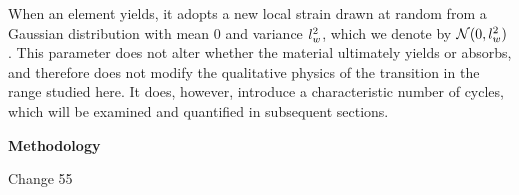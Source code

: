 \documentclass[asymmetricmargins]{library/duthesis}%
\newcommand{\DiffReportBodyFont}{\small}
\newcommand{\DiffReportLocationFont}{\large\bfseries}
\newcommand{\DiffReportMetaFont}{\small\ttfamily}
\newcommand{\DiffReportLocation}[1]{%
  \Needspace{4\baselineskip}%
  \par\medskip
  {\DiffReportLocationFont #1\par}
}
\newcommand{\DiffReportChange}[1]{%
  \Needspace{4\baselineskip}%
  \par\smallskip
  {\DiffReportMetaFont Change #1\par}
  \smallskip
}
\newenvironment{DiffReportContent}
  {\begingroup\DiffReportBodyFont}
  {\par\endgroup\medskip}
\providecommand{\DIFaddend}{} %
\begin{document}
\begin{DiffReportContent}
\DIFaddend 

When an element yields, it adopts a new local strain drawn at random from a Gaussian distribution with mean $0$ and variance $l_w^2$, which we denote by $\mathcal{N}(0,l_w^2)$. This parameter does not alter whether the material ultimately yields or absorbs, and therefore does not modify the qualitative physics of the transition in the range studied here. It does, however, introduce a characteristic number of cycles, which will be examined and quantified in subsequent sections. 
\end{DiffReportContent}
\DiffReportLocation{Methodology}
\DiffReportChange{55}
\end{document}
